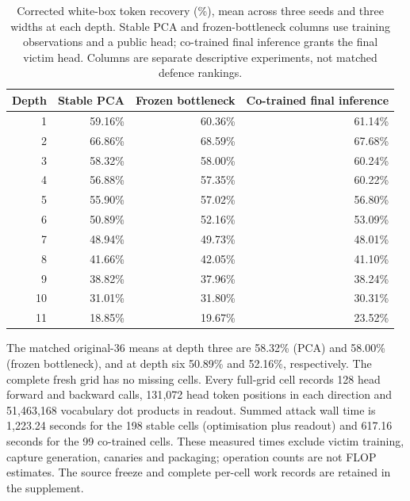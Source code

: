 \documentclass[11pt]{article}
\begin{document}
\begin{table}[ht]
\centering\small
\caption{Corrected white-box token recovery (\%), mean across three seeds and three widths at each depth. Stable PCA and frozen-bottleneck columns use training observations and a public head; co-trained final inference grants the final victim head. Columns are separate descriptive experiments, not matched defence rankings.}
\label{tab:whitebox}
\begin{tabular}{rrrr}
\toprule
Depth & Stable PCA & Frozen bottleneck & Co-trained final inference \\
\midrule
1 & 59.16\% & 60.36\% & 61.14\% \\
2 & 66.86\% & 68.59\% & 67.68\% \\
3 & 58.32\% & 58.00\% & 60.24\% \\
4 & 56.88\% & 57.35\% & 60.22\% \\
5 & 55.90\% & 57.02\% & 56.80\% \\
6 & 50.89\% & 52.16\% & 53.09\% \\
7 & 48.94\% & 49.73\% & 48.01\% \\
8 & 41.66\% & 42.05\% & 41.10\% \\
9 & 38.82\% & 37.96\% & 38.24\% \\
10 & 31.01\% & 31.80\% & 30.31\% \\
11 & 18.85\% & 19.67\% & 23.52\% \\
\bottomrule
\end{tabular}
\end{table}

The matched original-36 means at depth three are 58.32\% (PCA) and 58.00\% (frozen bottleneck), and at depth six 50.89\% and 52.16\%, respectively. The complete fresh grid has no missing cells. Every full-grid cell records 128 head forward and backward calls, 131{,}072 head token positions in each direction and 51{,}463{,}168 vocabulary dot products in readout. Summed attack wall time is 1{,}223.24 seconds for the 198 stable cells (optimisation plus readout) and 617.16 seconds for the 99 co-trained cells. These measured times exclude victim training, capture generation, canaries and packaging; operation counts are not FLOP estimates. The source freeze and complete per-cell work records are retained in the supplement.
\end{document}
